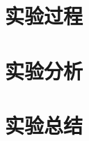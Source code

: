 \documentclass[a4paper]{article}
\theoremstyle{definition}
\theoremstyle{plain}
\theoremstyle{remark}
\begin{document}
\section{实验过程}

\section{实验分析}

\section{实验总结}




\clearpage
\appendix
{}
\end{document}
